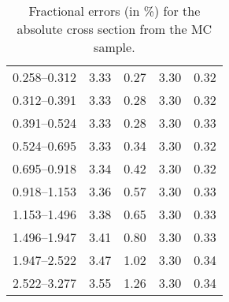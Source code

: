 \begin{table}
\begin{center}
\begin{tabular}{@{}l l l l l@{}}
            0.258--0.312 & 3.33 & 0.27 & 3.30 & 0.32  \\
            0.312--0.391 & 3.33 & 0.28 & 3.30 & 0.32  \\
            0.391--0.524 & 3.33 & 0.28 & 3.30 & 0.33  \\
            0.524--0.695 & 3.33 & 0.34 & 3.30 & 0.32  \\
            0.695--0.918 & 3.34 & 0.42 & 3.30 & 0.32  \\
            0.918--1.153 & 3.36 & 0.57 & 3.30 & 0.33  \\
            1.153--1.496 & 3.38 & 0.65 & 3.30 & 0.33  \\
            1.496--1.947 & 3.41 & 0.80 & 3.30 & 0.33  \\
            1.947--2.522 & 3.47 & 1.02 & 3.30 & 0.34  \\
            2.522--3.277 & 3.55 & 1.26 & 3.30 & 0.34  \\
            \bottomrule
        \end{tabular}
    \end{center}
    \caption[
        Fractional errors for the absolute cross section from the
        \MADGRAPH MC sample.
    ]{
        Fractional errors (in \%) for the absolute cross section from the
        \MADGRAPH MC sample.
    }
    \label{tab:madgraph_uncert_abs}
\end{table}
